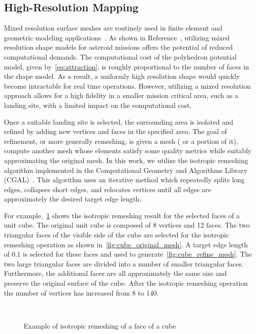 \documentclass[smallextended]{svjour3}       %
\begin{document}
\subsection{High-Resolution Mapping}\label{sec:refinement}

Mixed resolution surface meshes are routinely used in finite element and geometric modeling applications~\cite{botsch2010}.
As shown in Reference~\cite{mcmahon2017}, utilizing mixed resolution shape models for asteroid missions offers the potential of reduced computational demands.
The computational cost of the polyhedron potential model, given by~\cref{eq:attraction}, is roughly proportional to the number of faces in the shape model.
As a result, a uniformly high resolution shape would quickly become intractable for real time operations.
However, utilizing a mixed resolution approach allows for a high fidelity in a smaller mission critical area, such as a landing site, with a limited impact on the computational cost.

Once a suitable landing site is selected, the surrounding area is isolated and refined by adding new vertices and faces in the specified area.
The goal of refinement, or more generally remeshing, is given a mesh ( or a portion of it), compute another mesh whose elements satisfy some quality metrics while suitably approximating the original mesh.
In this work, we utilize the isotropic remeshing algorithm implemented in the Computational Geometry and Algorithms Library (CGAL)~\cite{cgalproject2018}.
This algorithm uses an iterative method which repeatedly splits long edges, collapses short edges, and relocates vertices until all edges are approximately the desired target edge length.

For example,~\cref{fig:cube_remesh} shows the isotropic remeshing result for the selected faces of a unit cube.
The original unit cube is composed of \num{8} vertices and \num{12} faces.
The two triangular faces of the visible side of the cube are selected for the isotropic remeshing operation as shown in~\cref{fig:cube_original_mesh}.
A target edge length of \num{0.1} is selected for these faces and used to generate~\cref{fig:cube_refine_mesh}.
The two large triangular faces are divided into a number of smaller triangular faces.
Furthermore, the additional faces are all approximately the same size and preserve the original surface of the cube.
After the isotropic remeshing operation the number of vertices has increased from \num{8} to \num{140}.
\begin{figure}[htbp]
    \centering
    ~
    \caption{Example of isotropic remeshing of a face of a cube\label{fig:cube_remesh}}
\end{figure}
\end{document}
